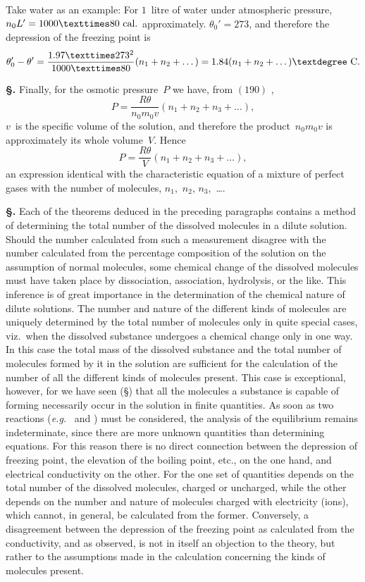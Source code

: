 \documentclass[12pt]{book}[2005/09/16]
\newcommand{\Chg}[2]{#2}
\newcommand{\Add}[1]{\Chg{}{#1}}
\newcommand{\Section}[1]{
  \medskip\par\textbf{§\;#1}
  \label{section:#1}
}
\newcommand{\SecRef}[2][§\;]{\hyperref[section:#2.]{{\upshape #1#2}}}
\newcommand{\Eq}[1]{%
  \hyperref[eqn:#1]{\ensuremath{#1}}%
}
\newcommand{\PageSep}[1]{\ignorespaces}
\newcommand{\eg}{\emph{e.g.}}
\newcommand{\Unit}[1]{\text{\upshape #1}}
\begin{document}
Take water as an example: For $1$~litre of water under
atmospheric pressure, $n_{0} L' = 1000 × 80~\Unit{cal.}$ approximately.
%
$\theta_{0}' = 273$, and therefore the depression of the freezing point is
\[
\theta_{0}' - \theta'
  = \frac{1.97 × 273^{2}}{1000 × 80} (n_{1} + n_{2} + \dots)
  = 1.84 (n_{1} + n_{2} + \dots)°~\Unit{C.}
\]

\Section{272.} Finally, for the osmotic pressure~$P$ we have, from
%
\Eq{(190)},
\[
P = \frac{R\theta}{n_{0} m_{0} v} (n_{1} + n_{2} + n_{3} + \dots),
\]
$v$~is the specific volume of the solution, and therefore the
product~$n_{0} m_{0} v$ is approximately its whole volume~$V$.
Hence
\[
P = \frac{R\theta}{V} (n_{1} + n_{2} + n_{3} + \dots),
\]
an expression identical with the characteristic equation of a
mixture of perfect gases with the number of molecules,
$n_{1}$,~$n_{2}$, $n_{3}$,~\dots\Add{.}

\Section{273.} Each of the theorems deduced in the preceding
paragraphs contains a method of determining the total
number of the dissolved molecules in a dilute solution.
Should the number calculated from such a measurement
disagree with the number calculated from the percentage
composition of the solution on the assumption of normal
molecules, some chemical change of the dissolved molecules
must have taken place by dissociation, association, hydrolysis,
or the like. This inference is of great importance in the
determination of the chemical nature of dilute solutions.
The number and nature of the different kinds of molecules
are uniquely determined by the total number of molecules
only in quite special cases, viz.\ when the dissolved
substance undergoes a chemical change only in one way.
In this case the total mass of the dissolved substance
and the total number of molecules formed by it in the
\PageSep{252}
solution are sufficient for the calculation of the number
of all the different kinds of molecules present. This
case is exceptional, however, for we have seen (\SecRef{259})
that all the molecules a substance is capable of forming
necessarily occur in the solution in finite quantities. As
soon as two reactions (\eg\  and
) must be considered, the analysis of
the equilibrium remains indeterminate, since there are more
unknown quantities than determining equations. For this
reason there is no direct connection between the depression
of freezing point, the elevation of the boiling point, etc., on
the one hand, and electrical conductivity on the other. For
the one set of quantities depends on the total number of
the dissolved molecules, charged or uncharged, while the
other depends on the number and nature of molecules
charged with electricity (ions), which cannot, in general,
be calculated from the former. Conversely, a disagreement
between the depression of the freezing point as calculated
from the conductivity, and as observed, is not in itself an
objection to the theory, but rather to the assumptions made
in the calculation concerning the kinds of molecules present.
\end{document}
